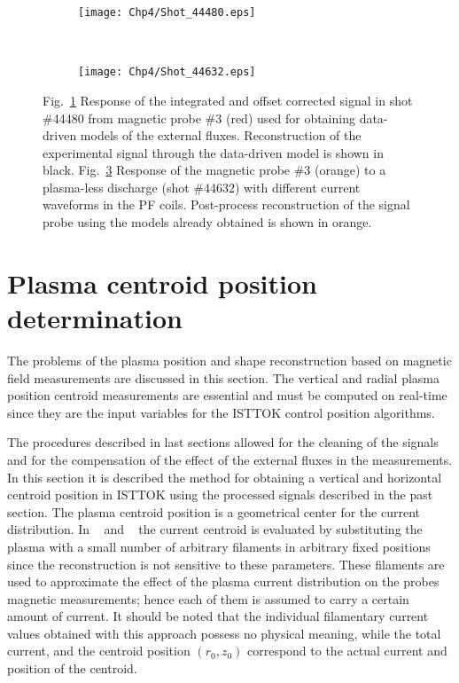 \begin{figure}
	\begin{subfigure}[b]{0.47\textwidth}
		\texttt{[image: Chp4/Shot\_44480.eps]}  
		\caption{\label{fig:44480} }
	\end{subfigure}
~
	\begin{subfigure}[b]{0.47\textwidth}
		\texttt{[image: Chp4/Shot\_44632.eps]}        
		\caption{\label{fig:44632}}
	\end{subfigure}
	
	\caption{Fig.~\ref{fig:44480} Response of the integrated and offset corrected signal in shot \#44480 from magnetic probe \#3 (red) used for obtaining data-driven models of the external fluxes. Reconstruction of the experimental signal through the data-driven model is shown in black. Fig.~\ref{fig:44632} Response of the  magnetic probe \#3 (orange) to a plasma-less discharge (shot \#44632) with different current waveforms in the PF coils. Post-process reconstruction of the  signal probe using the  models already obtained   is shown in orange. }
\end{figure}


\section{Plasma centroid position determination}

The problems of the plasma position and shape reconstruction based on magnetic field measurements are discussed in this section. The vertical and radial plasma position centroid measurements are essential and must be computed on real-time since they are the input variables for the ISTTOK control position algorithms.\smallskip

The procedures described in last sections allowed for the cleaning of the signals and for the compensation of the effect of the external fluxes in the measurements. In this section it is described the method for obtaining a vertical and horizontal centroid position in ISTTOK using the processed signals described in the past section.  The plasma centroid position  is a geometrical center for the current distribution. In ~\cite{Pironti1995} and ~\cite{Swain1982}  the current centroid is evaluated  by substituting the plasma with a small number of arbitrary filaments in arbitrary fixed positions since the reconstruction is not sensitive to these parameters. These filaments are used to approximate the effect of the plasma current distribution on the probes magnetic measurements; hence each of them is assumed to carry a certain amount of current. It should be noted that the individual filamentary current values obtained with this approach possess no physical meaning, while the total current, and the centroid position $(r_0,z_0)$ correspond to the actual current and position of the centroid.\smallskip

